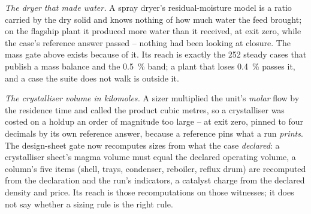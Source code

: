 \documentclass[11pt,a4paper]{article}
\begin{document}
\emph{The dryer that made water.}  A spray dryer's residual-moisture model
is a ratio carried by the dry solid and knows nothing of how much water the
feed brought; on the flagship plant it produced more water than it
received, at exit zero, while the case's reference answer passed -- nothing
had been looking at closure.  The mass gate above exists because of it.
Its reach is exactly the 252 steady cases that publish a mass balance and
the 0.5~\% band; a plant that loses 0.4~\% passes it, and a case the suite
does not walk is outside it.

\emph{The crystalliser volume in kilomoles.}  A sizer multiplied the unit's
\emph{molar} flow by the residence time and called the product cubic
metres, so a crystalliser was costed on a holdup an order of magnitude too
large -- at exit zero, pinned to four decimals by its own reference answer,
because a reference pins what a run \emph{prints}.  The design-sheet gate
now recomputes sizes from what the case \emph{declared}: a crystalliser
sheet's magma volume must equal the declared operating volume, a column's
five items (shell, trays, condenser, reboiler, reflux drum) are recomputed
from the declaration and the run's indicators, a catalyst charge from the
declared density and price.  Its reach is those recomputations on those
witnesses; it does not say whether a sizing rule is the right rule.
\end{document}

